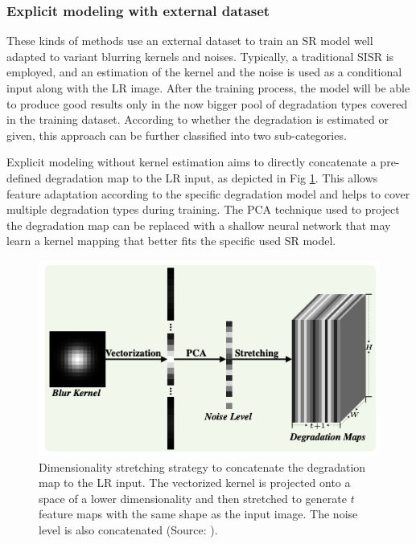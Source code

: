         \subsubsection{Explicit modeling with external dataset}

        These kinds of methods use an external dataset to train an SR model well adapted to variant blurring kernels and noises. 
        Typically, a traditional SISR is employed, and an estimation of the kernel and the noise is used as a conditional input along with the LR image.
        After the training process, the model will be able to produce good results only in the now bigger pool of degradation types covered in the training dataset.
        According to whether the degradation is estimated or given, this approach can be further classified into two sub-categories.


        Explicit modeling without kernel estimation aims to directly concatenate a pre-defined degradation map to the LR input, as depicted in Fig \ref{fig:2-external-dataset-stretching}. 
        This allows feature adaptation according to the specific degradation model and helps to cover multiple degradation types during training. 
        The PCA technique used to project the degradation map can be replaced with a shallow neural network that may learn a kernel mapping that better fits the specific used SR model.

        \begin{figure}[H]
            \centering
            \includegraphics[width=\textwidth]{Includes/2-external-dataset-stretching.png}
            \caption{Dimensionality stretching strategy to concatenate the degradation map to the LR input. 
                     The vectorized kernel is projected onto a space of a lower dimensionality and then stretched to generate $t$ feature maps with the same shape as the input image.
                     The noise level is also concatenated (Source: \cite{zhang2018residual}).}    
            \label{fig:2-external-dataset-stretching}
        \end{figure}

